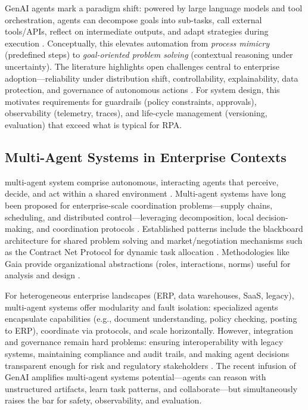 GenAI agents mark a paradigm shift: powered by large language models and tool orchestration, agents can decompose goals into sub-tasks, call external tools/APIs, reflect on intermediate outputs, and adapt strategies during execution \parencite{Park2023,Rodriguez_Agents_2025}. Conceptually, this elevates automation from \emph{process mimicry} (predefined steps) to \emph{goal-oriented problem solving} (contextual reasoning under uncertainty). The literature highlights open challenges central to enterprise adoption—reliability under distribution shift, controllability, explainability, data protection, and governance of autonomous actions \parencite{Bommasani2022}. For system design, this motivates requirements for guardrails (policy constraints, approvals), observability (telemetry, traces), and life-cycle management (versioning, evaluation) that exceed what is typical for RPA.
\subsection{Multi-Agent Systems in Enterprise Contexts}
multi-agent system comprise autonomous, interacting agents that perceive, decide, and act within a shared environment \parencite{Wooldridge2009}. Multi-agent systems have long been proposed for enterprise-scale coordination problems—supply chains, scheduling, and distributed control—leveraging decomposition, local decision-making, and coordination protocols \parencite{Parunak1999,JenningsBussmann2003}. Established patterns include the blackboard architecture for shared problem solving \parencite{Nii1986} and market/negotiation mechanisms such as the Contract Net Protocol for dynamic task allocation \parencite{Smith1980}. Methodologies like Gaia provide organizational abstractions (roles, interactions, norms) useful for analysis and design \parencite{Zambonelli2003}.

For heterogeneous enterprise landscapes (ERP, data warehouses, SaaS, legacy), multi-agent systems offer modularity and fault isolation: specialized agents encapsulate capabilities (e.g., document understanding, policy checking, posting to ERP), coordinate via protocols, and scale horizontally. However, integration and governance remain hard problems: ensuring interoperability with legacy systems, maintaining compliance and audit trails, and making agent decisions transparent enough for risk and regulatory stakeholders \parencite{Luck2005}. The recent infusion of GenAI amplifies multi-agent systems potential—agents can reason with unstructured artifacts, learn task patterns, and collaborate—but simultaneously raises the bar for safety, observability, and evaluation.
